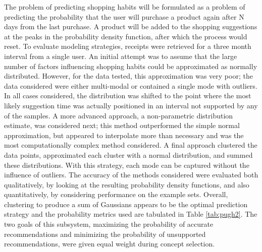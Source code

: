 \documentclass[11pt]{article} %
\begin{document}
The problem of predicting shopping habits will be formulated as a problem of predicting the probability that the user will purchase a product again after N days from the last purchase. A product will be added to the shopping suggestions at the peaks in the probability density function, after which the process would reset. To evaluate modeling strategies, receipts were retrieved for a three month interval from a single user. An initial attempt was to assume that the large number of factors influencing shopping habits could be approximated as normally distributed. However, for the data tested, this approximation was very poor; the data considered were either multi-modal or contained a single mode with outliers. In all cases considered, the distribution was shifted to the point where the most likely suggestion time was actually positioned in an interval not supported by any of the samples. A more advanced approach, a non-parametric distribution estimate, was considered next; this method outperformed the simple normal approximation, but appeared to interpolate more than necessary and was the most computationally complex method considered. A final approach clustered the data points, approximated each cluster with a normal distribution, and summed these distributions. With this strategy, each mode can be captured without the influence of outliers. The accuracy of the methods considered were evaluated both qualitatively, by looking at the resulting probability density functions, and also quantitatively, by considering performance on the example sets. Overall, clustering to produce a sum of Gaussians appears to be the optimal prediction strategy and the probability metrics used are tabulated in Table \ref{tab:pugh2}. The two goals of this subsystem, maximizing the probability of accurate recommendations and minimizing the probability of unsupported recommendations, were given equal weight during concept selection.
\end{document}
